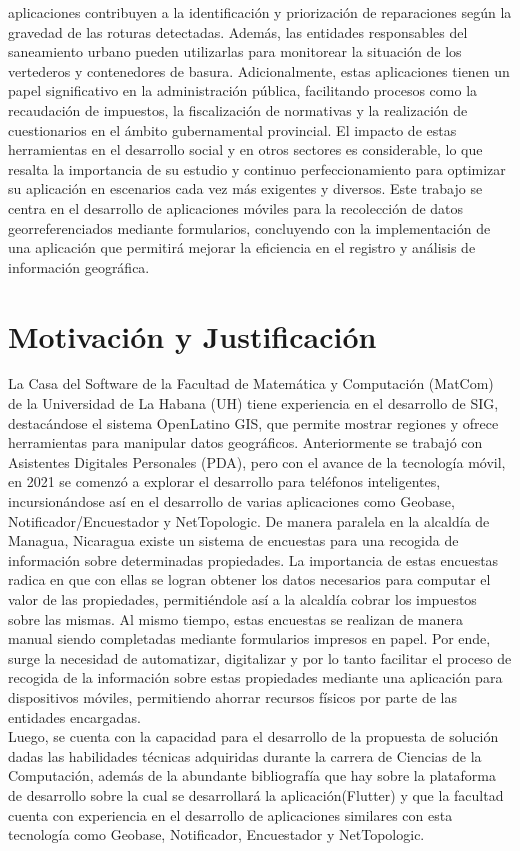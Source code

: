 aplicaciones contribuyen a la identificación y priorización de reparaciones según la
gravedad de las roturas detectadas. Además, las entidades responsables del
saneamiento urbano pueden utilizarlas para monitorear la situación de los
vertederos y contenedores de basura.
Adicionalmente, estas aplicaciones tienen un papel significativo en la administración
pública, facilitando procesos como la recaudación de impuestos, la fiscalización de
normativas y la realización de cuestionarios en el ámbito gubernamental provincial.
El impacto de estas herramientas en el desarrollo social y en otros sectores es
considerable, lo que resalta la importancia de su estudio y continuo
perfeccionamiento para optimizar su aplicación en escenarios cada vez más
exigentes y diversos.
Este trabajo se centra en el desarrollo de aplicaciones móviles para la recolección
de datos georreferenciados mediante formularios, concluyendo con la
implementación de una aplicación que permitirá mejorar la eficiencia en el registro y
análisis de información geográfica.
\section{Motivación y Justificación}
La Casa del Software de la Facultad de Matemática y Computación (MatCom) de la
Universidad de La Habana (UH) tiene experiencia en el desarrollo de SIG,
destacándose el sistema OpenLatino GIS, que permite mostrar regiones y ofrece
herramientas para manipular datos geográficos. Anteriormente se trabajó con
Asistentes Digitales Personales (PDA\cite{PDA}), pero con el avance de la tecnología móvil,
en 2021 se comenzó a explorar el desarrollo para teléfonos inteligentes,
incursionándose así en el desarrollo de varias aplicaciones como Geobase\cite{geoBase},
Notificador/Encuestador\cite{notificadorEncuestador} y NetTopologic\cite{netTopologic}.
De manera paralela en la alcaldía de Managua, Nicaragua existe un sistema de
encuestas para una recogida de información sobre determinadas propiedades. La
importancia de estas encuestas radica en que con ellas se logran obtener los datos
necesarios para computar el valor de las propiedades, permitiéndole así a la alcaldía
cobrar los impuestos sobre las mismas. Al mismo tiempo, estas encuestas se
realizan de manera manual siendo completadas mediante formularios impresos en
papel. Por ende, surge la necesidad de automatizar, digitalizar y por lo tanto facilitar el
proceso de recogida de la información sobre estas propiedades mediante
una aplicación para dispositivos móviles, permitiendo ahorrar recursos físicos por
parte de las entidades encargadas.\\
Luego, se cuenta con la capacidad para el desarrollo de la propuesta de solución
dadas las habilidades técnicas adquiridas durante la carrera de Ciencias de la
Computación, además de la abundante bibliografía que hay sobre la plataforma de
desarrollo sobre la cual se desarrollará la aplicación(Flutter) y que la facultad cuenta
con experiencia en el desarrollo de aplicaciones similares con esta tecnología como
Geobase, Notificador, Encuestador y NetTopologic.

